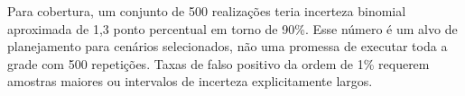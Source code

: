 Para cobertura, um conjunto de 500 realizações teria incerteza binomial
aproximada de 1,3 ponto percentual em torno de 90\%. Esse número é um
alvo de planejamento para cenários selecionados, não uma promessa de
executar toda a grade com 500 repetições. Taxas de falso positivo da
ordem de 1\% requerem amostras maiores ou intervalos de incerteza
explicitamente largos.

